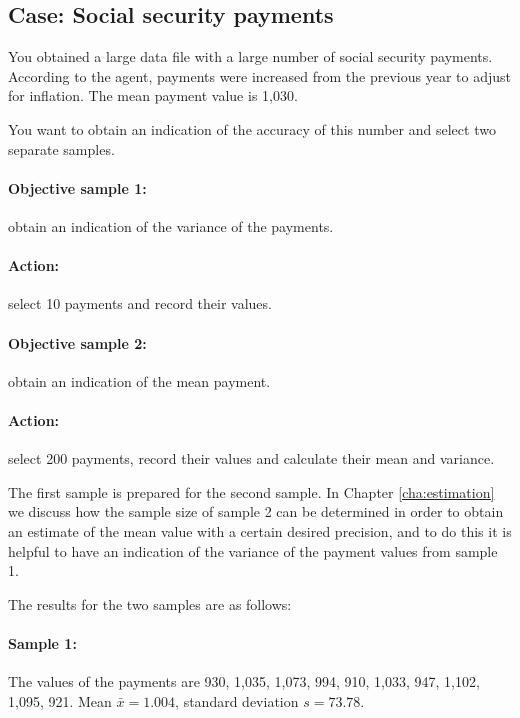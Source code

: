 \begin{mdframed}[hidealllines=true,backgroundcolor=KPMG_blue!10, innerleftmargin=0.3cm]
\section*{Case: Social security payments}
You obtained a large data file with a large number of social security payments. According to the agent, payments were increased from the previous year to adjust for inflation. The mean payment value is 1,030.

You want to obtain an indication of the accuracy of this number and select two separate samples.

\paragraph{Objective sample 1:} obtain an indication of the variance of the payments.
\paragraph{Action:} select 10 payments and record their values.

\paragraph{Objective sample 2:} obtain an indication of the mean payment.
\paragraph{Action:} select 200 payments, record their values and calculate their mean and variance.

\bigskip
The first sample is prepared for the second sample. In Chapter \ref{cha:estimation} we discuss how the sample size of sample 2 can be determined in order to obtain an estimate of the mean value with a certain desired precision, and to do this it is helpful to have an indication of the variance of the payment values from sample 1.

\bigskip
The results for the two samples are as follows:

\paragraph{Sample 1:}  The values of the payments are 930, 1,035, 1,073, 994, 910, 1,033, 947, 1,102, 1,095, 921.
Mean $\bar{x} = 1.004$, standard deviation $s = 73.78$.


\end{mdframed}
